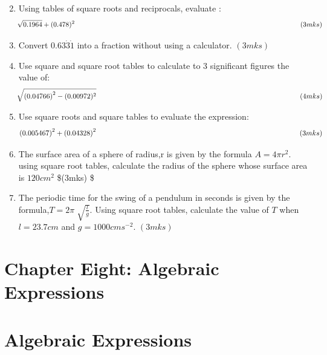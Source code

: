 \documentclass[
  a4paperpaper,
]{scrbook}
\begin{document}
\begin{tcolorbox}
\begin{enumerate}
\[  \]
\item
  Using tables of square roots and reciprocals, evaluate : \[
  \sqrt[]{0.1964}+(0.478)^2\hspace{11.5cm} (3mks)
  \]
\item
  Convert \(0.63\dot{3}\dot{1}\) into a fraction without using a
  calculator. \hspace{4.75cm} \((3mks)\)
\item
  Use square and square root tables to calculate to 3 significant
  figures the value of: \[
  \sqrt[]{\left(0.04766\right)^2-(0.00972)^2} \hspace{10.1cm} (4mks)
  \]
\item
  Use square roots and square tables to evaluate the expression: \[
  \left(0.005467\right)^2+\left(0.04328\right)^2 \hspace{9.95cm} (3mks)
  \]
\item
  The surface area of a sphere of radius,r is given by the formula
  \(A = 4\pi r^2\). using square root tables, calculate the radius of
  the sphere whose surface area is \(120 cm^2\) \hspace{3.2cm} \$(3mks)
  \$
\item
  The periodic time for the swing of a pendulum in seconds is given by
  the formula,\(T =2\pi\sqrt[]{\frac{l}{g}}\). Using square root tables,
  calculate the value of \(T\) when \(l = 23.7cm\) and
  \(g = 1000 cms^{-2}\). \hspace*{14.2cm} \((3mks)\)
\end{enumerate}

\end{tcolorbox}


\hypertarget{chapter-eight-algebraic-expressions}{%
\chapter{Chapter Eight: Algebraic
Expressions}\label{chapter-eight-algebraic-expressions}}


\hypertarget{algebraic-expressions}{%
\chapter*{Algebraic Expressions}\label{algebraic-expressions}}

\end{document}
